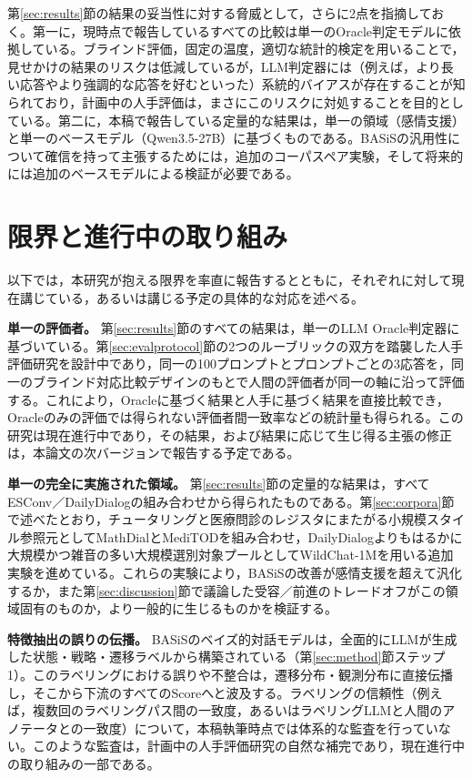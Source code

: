 \documentclass[manuscript,review,anonymous]{acmart}
\begin{document}
第\ref{sec:results}節の結果の妥当性に対する脅威として，さらに2点を指摘しておく。第一に，現時点で報告しているすべての比較は単一のOracle判定モデルに依拠している。ブラインド評価，固定の温度，適切な統計的検定を用いることで，見せかけの結果のリスクは低減しているが，LLM判定器には（例えば，より長い応答やより強調的な応答を好むといった）系統的バイアスが存在することが知られており，計画中の人手評価は，まさにこのリスクに対処することを目的としている。第二に，本稿で報告している定量的な結果は，単一の領域（感情支援）と単一のベースモデル（Qwen3.5-27B）に基づくものである。BASiSの汎用性について確信を持って主張するためには，追加のコーパスペア実験，そして将来的には追加のベースモデルによる検証が必要である。


\section{限界と進行中の取り組み}
\label{sec:limitations}

以下では，本研究が抱える限界を率直に報告するとともに，それぞれに対して現在講じている，あるいは講じる予定の具体的な対応を述べる。

\textbf{単一の評価者。} 第\ref{sec:results}節のすべての結果は，単一のLLM Oracle判定器に基づいている。第\ref{sec:evalprotocol}節の2つのルーブリックの双方を踏襲した人手評価研究を設計中であり，同一の100プロンプトとプロンプトごとの3応答を，同一のブラインド対応比較デザインのもとで人間の評価者が同一の軸に沿って評価する。これにより，Oracleに基づく結果と人手に基づく結果を直接比較でき，Oracleのみの評価では得られない評価者間一致率などの統計量も得られる。この研究は現在進行中であり，その結果，および結果に応じて生じ得る主張の修正は，本論文の次バージョンで報告する予定である。

\textbf{単一の完全に実施された領域。} 第\ref{sec:results}節の定量的な結果は，すべてESConv／DailyDialogの組み合わせから得られたものである。第\ref{sec:corpora}節で述べたとおり，チュータリングと医療問診のレジスタにまたがる小規模スタイル参照元としてMathDialとMediTODを組み合わせ，DailyDialogよりもはるかに大規模かつ雑音の多い大規模選別対象プールとしてWildChat-1Mを用いる追加実験を進めている。これらの実験により，BASiSの改善が感情支援を超えて汎化するか，また第\ref{sec:discussion}節で議論した受容／前進のトレードオフがこの領域固有のものか，より一般的に生じるものかを検証する。

\textbf{特徴抽出の誤りの伝播。} BASiSのベイズ的対話モデルは，全面的にLLMが生成した状態・戦略・遷移ラベルから構築されている（第\ref{sec:method}節ステップ1）。このラベリングにおける誤りや不整合は，遷移分布・観測分布に直接伝播し，そこから下流のすべてのScoreへと波及する。ラベリングの信頼性（例えば，複数回のラベリングパス間の一致度，あるいはラベリングLLMと人間のアノテータとの一致度）について，本稿執筆時点では体系的な監査を行っていない。このような監査は，計画中の人手評価研究の自然な補完であり，現在進行中の取り組みの一部である。
\end{document}
